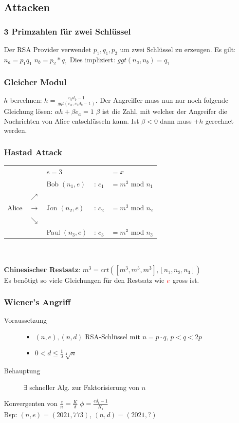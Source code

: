 \documentclass[landscape,twocolumn,a4paper]{article}
\newcommand{\Oneover}[1]{\frac{1}{#1}} %
\begin{document}
\subsection{Attacken}
\subsubsection{3 Primzahlen für zwei Schlüssel}
Der RSA Provider verwendet $p_1, q_1, p_2$ um zwei Schlüssel zu erzeugen. Es gilt: $n_a = p_1 q_1$ $n_b = p_2*q_1$ Dies impliziert: $ggt(n_a, n_b) = q_1$
\subsubsection{Gleicher Modul}
$h$ berechnen: $ h = \frac{e_b d_b - 1}{ggt(e_a, e_b d_b -1)}$. Der
Angreiffer muss nun nur noch folgende Gleichung lösen: $\alpha h + \beta e_a = 1$ $\beta$ ist die Zahl, mit welcher der Angreifer die Nachrichten von Alice entschlüsseln kann. Ist $\beta < 0$ dann muss $+h$ gerechnet werden.
\subsubsection{Hastad Attack}
\begin{tabular}{l l l l l}
    & & {\color{red} $e=3$} & & $=x$ \\
	&  & Bob $(n_1,e)$ & : {\color{red}$c_1$} & $= m^3$ mod $n_1$\\
	&$\nearrow$  \\
	Alice & $\rightarrow$ & Jon $(n_2,e)$ & : {\color{red}$c_2$} & $= m^3$ mod $n_2$\\
	& $\searrow$ \\
	& & Paul $(n_3,e)$ & : {\color{red}$c_3$} & $= m^3$ mod $n_3$
\end{tabular} \\ \\
\textbf{Chinesischer Restsatz}: $m^3= crt([m^3,m^3,m^3],[n_1,n_2,n_3])$ \\
Es benötigt so viele Gleichungen für den Restsatz wie ${\color{red}e}$ gross ist.
\subsubsection{Wiener's Angriff}
\begin{description}
 \item [Voraussetzung] \hfill
    \begin{itemize}
      \item $(n,e),(n,d)$ RSA-Schlüssel mit $n=p\cdot q$, $p<q<2p$
      \item $0<d\leqslant\Oneover{3}\sqrt[4]{n}$
    \end{itemize}
 \item [Behauptung] $\exists$ schneller Alg. zur Faktorisierung von $n$
\end{description}
Konvergenten von $\frac{e}{n} = \frac{K}{\delta}$ $\phi = \frac{e \delta_{i}-1}{K_i}$\\
Bsp: $(n,e) = (2021, 773)$, $(n,d) = (2021, ?)$\\
\end{document}
